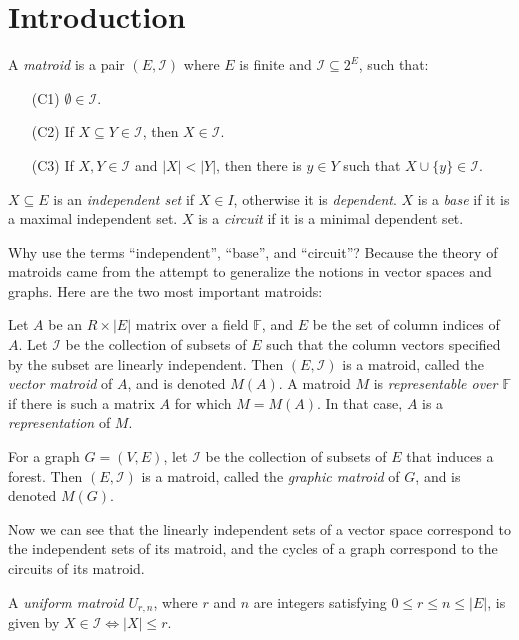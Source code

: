

    \section{Introduction}
    
    \begin{defn}[Matroid] \label{def_matroid}
        A \emph{matroid} is a pair $(E,\mathcal{I})$ where $E$ is finite and $\mathcal{I} \subseteq 2^E$, such that:\begin{enumerate}
            \item[(C1)] $\emptyset \in \mathcal{I}$.
            \item[(C2)] If $X \subseteq Y \in \mathcal{I}$, then $X \in \mathcal{I}$.
            \item[(C3)] If $X,Y \in \mathcal{I}$ and $|X| < |Y|$, then there is $y \in Y$ such that $X \cup \{y\} \in \mathcal{I}$.
        \end{enumerate}
        $X \subseteq E$ is an \emph{independent set} if $X \in I$, otherwise it is \emph{dependent}. $X$ is a \emph{base} if it is a maximal independent set. $X$ is a \emph{circuit} if it is a minimal dependent set.
    \end{defn}
    
    Why use the terms ``independent'', ``base'', and ``circuit''? Because the theory of matroids came from the attempt to generalize the notions in vector spaces and graphs. Here are the two most important matroids:
    
    \begin{defn} \label{def_vector_matroid}
        Let $A$ be an $R \times |E|$ matrix over a field $\mathbb{F}$, and $E$ be the set of column indices of $A$. Let $\mathcal{I}$ be the collection of subsets of $E$ such that the column vectors specified by the subset are linearly independent. Then $(E,\mathcal{I})$ is a matroid, called the \emph{vector matroid} of $A$, and is denoted $M(A)$. A matroid $M$ is \emph{representable over $\mathbb{F}$} if there is such a matrix $A$ for which $M = M(A)$. In that case, $A$ is a \emph{representation} of $M$.
    \end{defn}
    
    \begin{defn} \label{def_graphic_matroid}
        For a graph $G=(V,E)$, let $\mathcal{I}$ be the collection of subsets of $E$ that induces a forest. Then $(E,\mathcal{I})$ is a matroid, called the \emph{graphic matroid} of $G$, and is denoted $M(G)$.
    \end{defn}
    
    Now we can see that the linearly independent sets of a vector space correspond to the independent sets of its matroid, and the cycles of a graph correspond to the circuits of its matroid.
    
    \begin{defn} \label{def_uniform_matroid}
        A \emph{uniform matroid} $U_{r,n}$, where $r$ and $n$ are integers satisfying $0 \leq r \leq n \leq |E|$, is given by $X \in \mathcal{I} \iff |X| \leq r$.
    \end{defn}
    

